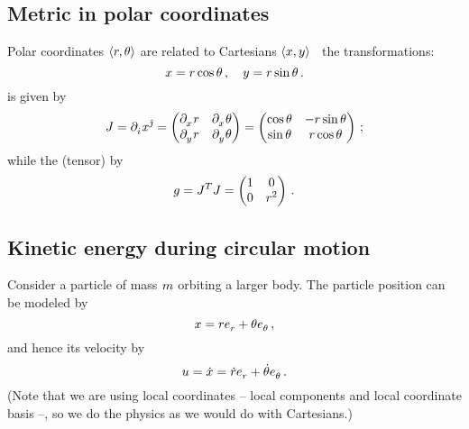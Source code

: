 \subsection{Metric in polar coordinates}
\label{subsec:metric-polar-coordinates}

Polar coordinates $\tuple{\cxpos,\cypos}$ are related to Cartesians $\tuple{\xpos,\ypos}$ \via\ the transformations:
%
\begin{equation*}
  x = r\cos\theta\,,
  \quad
  y = r\sin\theta\,.
\end{equation*}
%
 is given by
%
\begin{equation*}
  \jacob = \cpd i\tvec\pos{\hat\jmath}
  =
  \begin{pmatrix}
    \cpd\xpos\cxpos & \cpd\xpos\cypos \\
    \cpd\ypos\cxpos & \cpd\ypos\cypos \\
  \end{pmatrix}
  =
  \begin{pmatrix}
    \cos\cypos & -\cxpos\sin\cypos \\
    \sin\cypos & \cxpos\cos\cypos
  \end{pmatrix}
  \,;
\end{equation*}
%
while the  (tensor) by
%
\begin{equation*}
  g = J^TJ
  =
  \begin{pmatrix}
    1 & 0 \\
    0 & r^2 \\
  \end{pmatrix}
  \,.
\end{equation*}


\subsection{Kinetic energy during circular motion}
\label{subsec:kin-energy-circular-motion}

Consider a particle of mass $m$ orbiting a larger body. The particle position can be modeled by
%
\begin{equation*}
  \pos = \cxpos\tbvec\cxpos + \cypos\tbvec\cypos\,,
\end{equation*}
%
and hence its velocity by
%
\begin{equation*}
  \vel = \mdt\pos = \mdt\cxpos\tbvec\cxpos + \mdt\cypos\tbvec\cypos\,.
\end{equation*}
%
(Note that we are using local coordinates -- local components and local coordinate basis --, so we do the physics as we would do with Cartesians.)

